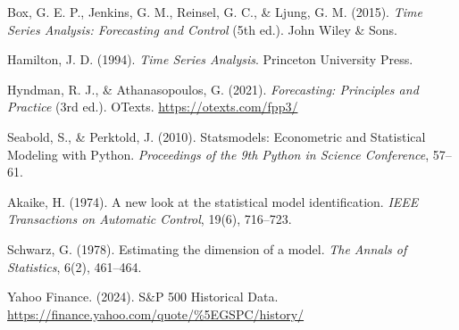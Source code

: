 \documentclass[12pt, a4paper]{article}
\begin{document}
\begin{enumerate}[leftmargin=*, label={[\arabic*]}]
  \item Box, G. E. P., Jenkins, G. M., Reinsel, G. C., \& Ljung, G. M. (2015).
        \textit{Time Series Analysis: Forecasting and Control} (5th ed.).
        John Wiley \& Sons.

  \item Hamilton, J. D. (1994). \textit{Time Series Analysis}.
        Princeton University Press.

  \item Hyndman, R. J., \& Athanasopoulos, G. (2021).
        \textit{Forecasting: Principles and Practice} (3rd ed.).
        OTexts. \url{https://otexts.com/fpp3/}

  \item Seabold, S., \& Perktold, J. (2010). Statsmodels: Econometric and
        Statistical Modeling with Python. \textit{Proceedings of the 9th
        Python in Science Conference}, 57--61.

  \item Akaike, H. (1974). A new look at the statistical model identification.
        \textit{IEEE Transactions on Automatic Control}, 19(6), 716--723.

  \item Schwarz, G. (1978). Estimating the dimension of a model.
        \textit{The Annals of Statistics}, 6(2), 461--464.

  \item Yahoo Finance. (2024). S\&P 500 Historical Data.
        \url{https://finance.yahoo.com/quote/\%5EGSPC/history/}
\end{enumerate}
\end{document}
